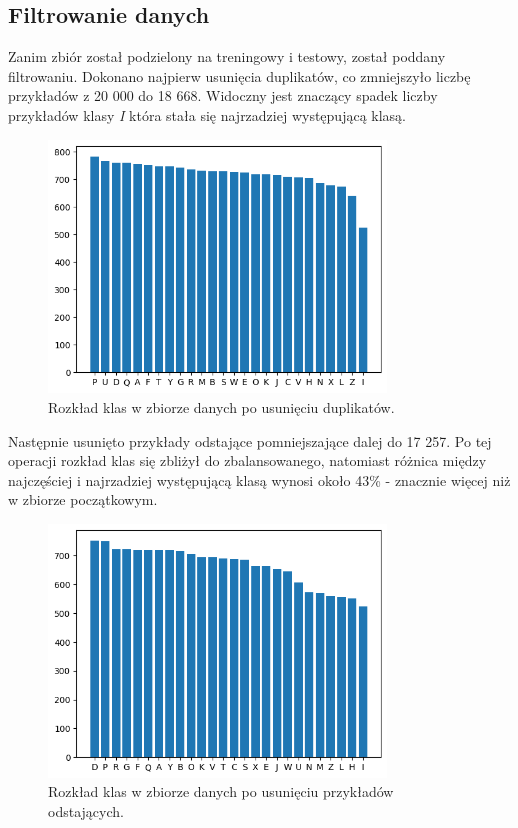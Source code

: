 \subsection{Filtrowanie danych}\label{subsec:filtrowanie_danych}
Zanim zbiór został podzielony na treningowy i testowy, został poddany filtrowaniu.
Dokonano najpierw usunięcia duplikatów, co zmniejszyło liczbę przykładów z 20 000 do 18 668.
Widoczny jest znaczący spadek liczby przykładów klasy \textit{I} która stała się najrzadziej występującą klasą.
\begin{figure}[H]
    \centering
    \includegraphics[width=0.8\textwidth]{img/bar_letter_count_duplicates.png}
    \caption{Rozkład klas w zbiorze danych po usunięciu duplikatów.}
    \label{fig:bar_letter_count_duplicates}
\end{figure}
Następnie usunięto przykłady odstające pomniejszające dalej do 17 257. Po tej operacji rozkład klas się zbliżył
do zbalansowanego, natomiast różnica między najczęściej i najrzadziej występującą klasą wynosi około 
43\% - znacznie więcej niż w zbiorze początkowym.
\begin{figure}[H]
    \centering
    \includegraphics[width=0.8\textwidth]{img/bar_letter_count_outliers.png}
    \caption{Rozkład klas w zbiorze danych po usunięciu przykładów odstających.}
    \label{fig:bar_letter_count_outliers}
\end{figure}
